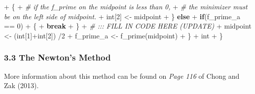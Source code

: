 \documentclass[
]{article}
\newenvironment{Shaded}{\begin{snugshade}}{\end{snugshade}}
\newcommand{\CommentTok}[1]{\textcolor[rgb]{0.56,0.35,0.01}{\textit{#1}}}
\newcommand{\ControlFlowTok}[1]{\textcolor[rgb]{0.13,0.29,0.53}{\textbf{#1}}}
\newcommand{\DecValTok}[1]{\textcolor[rgb]{0.00,0.00,0.81}{#1}}
\newcommand{\FunctionTok}[1]{\textcolor[rgb]{0.00,0.00,0.00}{#1}}
\newcommand{\NormalTok}[1]{#1}
\newcommand{\OtherTok}[1]{\textcolor[rgb]{0.56,0.35,0.01}{#1}}
\newcommand{\SpecialCharTok}[1]{\textcolor[rgb]{0.00,0.00,0.00}{#1}}
\begin{document}
\begin{Shaded}
\begin{Highlighting}[]
\SpecialCharTok{+}\NormalTok{       \{}
\SpecialCharTok{+}         \CommentTok{\# if the f\_prime on the midpoint is less than 0,}
\SpecialCharTok{+}         \CommentTok{\# the minimizer must be on the left side of midpoint.}
\SpecialCharTok{+}\NormalTok{         int[}\DecValTok{2}\NormalTok{] }\OtherTok{\textless{}{-}}\NormalTok{ midpoint}
\SpecialCharTok{+}\NormalTok{       \} }\ControlFlowTok{else}
\SpecialCharTok{+}         \ControlFlowTok{if}\NormalTok{(f\_prime\_a }\SpecialCharTok{==} \DecValTok{0}\NormalTok{)}
\SpecialCharTok{+}\NormalTok{         \{}
\SpecialCharTok{+}           \ControlFlowTok{break}
\SpecialCharTok{+}\NormalTok{         \}}
\SpecialCharTok{+}     \CommentTok{\# ::: FILL IN CODE HERE (UPDATE)}
\SpecialCharTok{+}\NormalTok{     midpoint }\OtherTok{\textless{}{-}}\NormalTok{ (int[}\DecValTok{1}\NormalTok{]}\SpecialCharTok{+}\NormalTok{int[}\DecValTok{2}\NormalTok{]) }\SpecialCharTok{/}\DecValTok{2}
\SpecialCharTok{+}\NormalTok{     f\_prime\_a }\OtherTok{\textless{}{-}} \FunctionTok{f\_prime}\NormalTok{(midpoint)}
\SpecialCharTok{+}\NormalTok{   \}}
\SpecialCharTok{+}\NormalTok{   int}
\SpecialCharTok{+}\NormalTok{ \}}
\end{Highlighting}
\end{Shaded}

\hypertarget{the-newtons-method}{%
\subsubsection{3.3 The Newton's Method}\label{the-newtons-method}}

More information about this method can be found on \emph{Page 116} of
Chong and Zak (2013).
\end{document}
